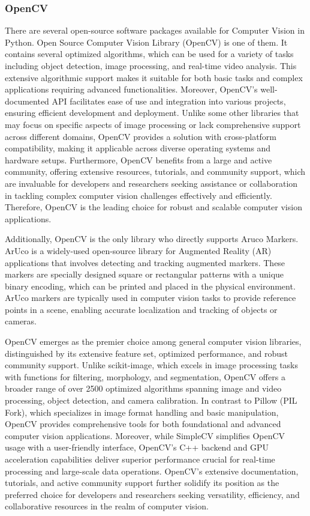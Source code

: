 \subsubsection{OpenCV}
There are several open-source software packages available for Computer Vision in Python.
Open Source Computer Vision Library (OpenCV) is one of them.
It contains several optimized algorithms, which can be used for a variety of tasks including object detection, image processing, and real-time video analysis.
This extensive algorithmic support makes it suitable for both basic tasks and complex applications requiring advanced functionalities.
Moreover, OpenCV's well-documented API facilitates ease of use and integration into various projects, ensuring efficient development and deployment.
Unlike some other libraries that may focus on specific aspects of image processing or lack comprehensive support across different domains, OpenCV provides a solution with cross-platform compatibility, making it applicable across diverse operating systems and hardware setups.
Furthermore, OpenCV benefits from a large and active community, offering extensive resources, tutorials, and community support, which are invaluable for developers and researchers seeking assistance or collaboration in tackling complex computer vision challenges effectively and efficiently.
Therefore, OpenCV is the leading choice for robust and scalable computer vision applications.



Additionally, OpenCV is the only library who directly supports Aruco Markers.
ArUco is a widely-used open-source library for Augmented Reality (AR) applications that involves detecting and tracking augmented markers.
These markers are specially designed square or rectangular patterns with a unique binary encoding, which can be printed and placed in the physical environment.
ArUco markers are typically used in computer vision tasks to provide reference points in a scene, enabling accurate localization and tracking of objects or cameras.

OpenCV emerges as the premier choice among general computer vision libraries, distinguished by its extensive feature set, optimized performance, and robust community support.
Unlike scikit-image, which excels in image processing tasks with functions for filtering, morphology, and segmentation, OpenCV offers a broader range of over 2500 optimized algorithms spanning image and video processing, object detection, and camera calibration.
In contrast to Pillow (PIL Fork), which specializes in image format handling and basic manipulation, OpenCV provides comprehensive tools for both foundational and advanced computer vision applications.
Moreover, while SimpleCV simplifies OpenCV usage with a user-friendly interface, OpenCV's C++ backend and GPU acceleration capabilities deliver superior performance crucial for real-time processing and large-scale data operations.
OpenCV's extensive documentation, tutorials, and active community support further solidify its position as the preferred choice for developers and researchers seeking versatility, efficiency, and collaborative resources in the realm of computer vision.


